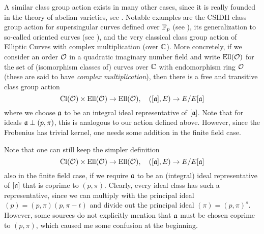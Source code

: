 A similar class group action exists in many other cases, since it is really founded in the theory of abelian varieties, see \cite{class_group_action_waterhouse}.
Notable examples are the CSIDH class group action for supersingular curves defined over $\mathbb{F}_p$ (see \cite{csidh}), its generalization to so-called oriented curves (see \cite{osidh}), and the very classical class group action of Elliptic Curves with complex multiplication (over $\mathbb{C}$).
More concretely, if we consider an order $\mathcal{O}$ in a quadratic imaginary number field and write $\mathrm{Ell}(\mathcal{O})$ for the set of (isomorphism classes of) curves over $\mathbb{C}$ with endomorphism ring $\mathcal{O}$ (these are said to have \emph{complex multiplication}), then there is a free and transitive class group action
\begin{equation*}
    \mathrm{Cl}(\mathcal{O}) \times \mathrm{Ell}(\mathcal{O}) \to \mathrm{Ell}(\mathcal{O}), \quad ([\mathfrak{a}], E) \to E/E[\mathfrak{a}]
\end{equation*}
where we choose $\mathfrak{a}$ to be an integral ideal representative of $[\mathfrak{a}]$.
Note that for ideals $\mathfrak{a} \perp (p, \pi)$, this is analogous to our action defined above.
However, since the Frobenius has trivial kernel, one needs some addition in the finite field case.

Note that one can still keep the simpler definition
\begin{equation*}
    \mathrm{Cl}(\mathcal{O}) \times \mathrm{Ell}(\mathcal{O}) \to \mathrm{Ell}(\mathcal{O}), \quad ([\mathfrak{a}], E) \to E/E[\mathfrak{a}]
\end{equation*}
also in the finite field case, if we require $\mathfrak{a}$ to be an (integral) ideal representative of $[\mathfrak{a}]$ that is coprime to $(p, \pi)$.
Clearly, every ideal class has such a representative, since we can multiply with the principal ideal $(p) = (p, \pi)(p, \pi - t)$ and divide out the principal ideal $(\pi) = (p, \pi)^s$.
However, some sources do not explicitly mention that $\mathfrak{a}$ must be chosen coprime to $(p, \pi)$, which caused me some confusion at the beginning.


